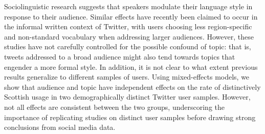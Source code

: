 Sociolinguistic research suggests that speakers modulate their language style in response to their audience. Similar effects have recently been claimed to occur in the informal written context of Twitter, with users choosing less region-specific and non-standard vocabulary when addressing larger audiences. However, these studies have not carefully controlled for the possible confound of topic: that is, tweets addressed to a broad audience might also tend towards topics that engender a more formal style. In addition, it is not clear to what extent previous results generalize to different samples of users. Using mixed-effects models, we show that audience and topic have independent effects on the rate of distinctively Scottish usage in two demographically distinct Twitter user samples. However, not all effects are consistent between the two groups, underscoring the importance of replicating studies on distinct user samples before drawing strong conclusions from social media data.
